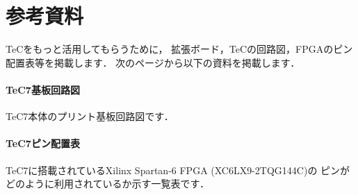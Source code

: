 \renewcommand{\myincludegraphics}[2]{\texttt{[image: appD/\#1]}}

\newpage
\onecolumn
\chapter{参考資料}

TeCをもっと活用してもらうために，
拡張ボード，TeCの回路図，FPGAのピン配置表等を掲載します．
次のページから以下の資料を掲載します．

\subsubsection{TeC7基板回路図}
TeC7本体のプリント基板回路図です．

\subsubsection{TeC7ピン配置表}
TeC7に搭載されているXilinx Spartan-6 FPGA (XC6LX9-2TQG144C)の
ピンがどのように利用されているか示す一覧表です．

\newpage
{}

\newpage
{}
